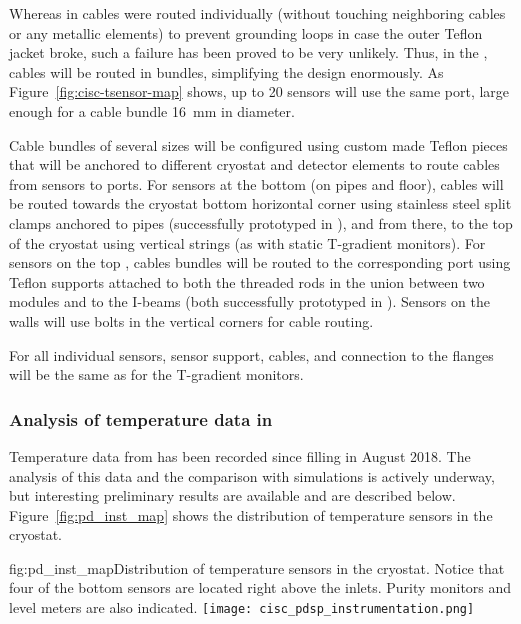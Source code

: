 Whereas in  cables were routed individually (without touching neighboring cables or any metallic elements) to prevent grounding loops in case the outer Teflon jacket broke, such a failure has been proved to be very unlikely. Thus, in the , cables will be routed in bundles, simplifying the design enormously. As Figure~\ref{fig:cisc-tsensor-map} shows, up to 20 sensors will use the same  port, large enough for a cable bundle \SI{16}{mm} in diameter.

Cable bundles of several sizes will be configured using custom made Teflon 
pieces %
that will be anchored to different cryostat and detector elements to route cables from sensors to  ports. For sensors at the bottom (on pipes and floor), cables will be routed towards the cryostat bottom horizontal corner using stainless steel split clamps anchored to pipes (successfully prototyped in ), and from there, to the top of the cryostat using vertical strings (as with static T-gradient monitors). For sensors on the top , cables bundles will be routed to the corresponding  port using Teflon supports attached to both the \frfour threaded rods in the union between two  modules and to the  I-beams (both successfully prototyped in ). Sensors on the walls will use bolts in the vertical corners for cable routing. 

For all individual sensors,  sensor support, cables, and connection to the flanges will be the same as for the T-gradient monitors. 
  

\subsubsection{Analysis of temperature data in }
\label{sec:fdgen-slow-cryo-temp-ana}


Temperature data from  has been recorded since  filling %
in August 2018. The analysis of this data and the comparison with  simulations is actively underway, but interesting preliminary results are available and are described below. Figure~\ref{fig:pd_inst_map} shows the distribution of temperature sensors in the  cryostat.  

\begin{dunefigure}{fig:pd_inst_map}{Distribution of temperature sensors in the  cryostat. Notice that four of the bottom sensors are located right above the  inlets. Purity monitors and level meters are also indicated. }
  \texttt{[image: cisc\_pdsp\_instrumentation.png]}%
\end{dunefigure}


